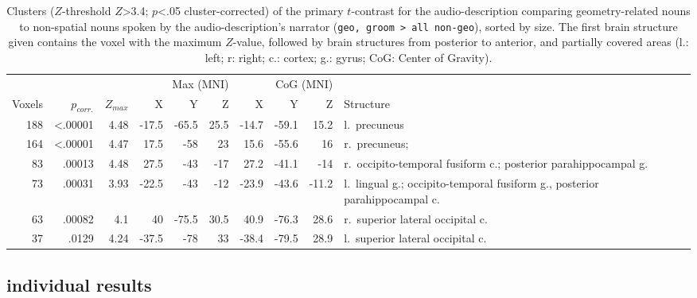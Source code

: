 \documentclass[english]{article}
\begin{document}
\begin{table*}[tbp]
\caption{Clusters ($Z$-threshold $Z$>3.4; $p$<.05 cluster-corrected)
    of the primary $t$-contrast for the audio-description comparing
    geometry-related nouns to non-spatial nouns spoken by the
    audio-description's narrator (\texttt{geo, groom > all non-geo}), sorted by size.
    The first brain structure given contains the voxel with the maximum $Z$-value,
    followed by brain structures from posterior to anterior, and partially
    covered areas (l.: left; r: right; c.: cortex; g.: gyrus; CoG: Center of
    Gravity).}
    \label{tab:res-ao-group1}
\small
\begin{tabular}{rrrrrrrrrp{4.7cm}}
\toprule
& & & \multicolumn{3}{r}{Max (MNI)} & \multicolumn{3}{r}{CoG (MNI)} &
\\ \cmidrule{4-6} \cmidrule{7-9}
Voxels & $p_{corr.}$ & $Z_{max}$ & X & Y & Z  & X & Y & Z & Structure \\
\midrule
188 & <.00001 & 4.48 & -17.5 & -65.5 & 25.5 & -14.7 & -59.1 & 15.2 & l.~precuneus \\ %
164 & <.00001 & 4.47 & 17.5 & -58 & 23 & 15.6 & -55.6 & 16 & r.~precuneus;
\\ %
83 & .00013 & 4.48 & 27.5 & -43 & -17 & 27.2 & -41.1 & -14 & r.~occipito-temporal fusiform c.; posterior parahippocampal g. \\ %
73 & .00031 & 3.93 & -22.5 & -43 & -12 & -23.9 & -43.6 & -11.2 & l.~lingual
g.; occipito-temporal fusiform g., posterior parahippocampal c. \\ %
63 & .00082 & 4.1 & 40 & -75.5 & 30.5 & 40.9 & -76.3 & 28.6 & r.~superior
lateral occipital c. \\ %
37 & .0129 & 4.24 & -37.5 & -78 & 33 & -38.4 & -79.5 & 28.9 & l.~superior
lateral occipital c. \\ %
\bottomrule
\end{tabular}
\end{table*}


\subsection{individual results}
\end{document}
